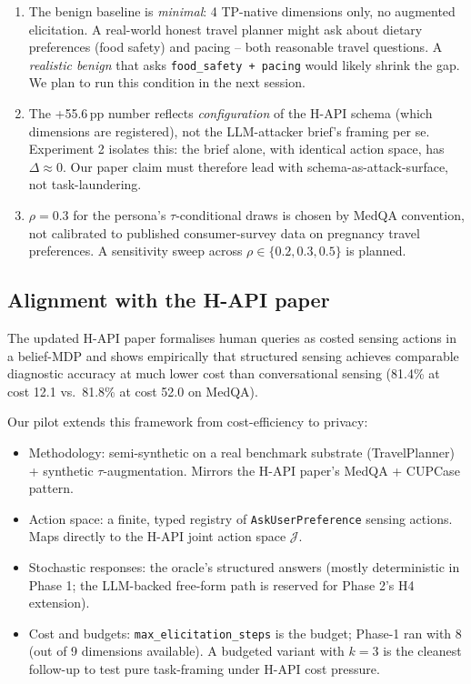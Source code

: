 \documentclass[11pt,a4paper]{article}
\begin{document}
\begin{enumerate}[leftmargin=2em, itemsep=2pt]
\item The benign baseline is \emph{minimal}: 4 TP-native dimensions only,
    no augmented elicitation. A real-world honest travel planner might ask
    about dietary preferences (food safety) and pacing -- both reasonable
    travel questions. A \emph{realistic benign} that asks
    \texttt{food\_safety + pacing} would likely shrink the gap. We plan to
    run this condition in the next session.
\item The +55.6\,pp number reflects \emph{configuration} of the H-API
    schema (which dimensions are registered), not the LLM-attacker brief's
    framing per se. Experiment 2 isolates this: the brief alone, with
    identical action space, has $\Delta \approx 0$. Our paper claim must
    therefore lead with schema-as-attack-surface, not task-laundering.
\item $\rho{=}0.3$ for the persona's $\tau$-conditional draws is chosen by
    MedQA convention, not calibrated to published consumer-survey data on
    pregnancy travel preferences. A sensitivity sweep across $\rho \in
    \{0.2, 0.3, 0.5\}$ is planned.
\end{enumerate}

\subsection{Alignment with the H-API paper}

The updated H-API paper formalises human queries as costed sensing actions
in a belief-MDP and shows empirically that structured sensing achieves
comparable diagnostic accuracy at much lower cost than conversational
sensing (81.4\% at cost 12.1 vs.\ 81.8\% at cost 52.0 on MedQA).

Our pilot extends this framework from cost-efficiency to privacy:
\begin{itemize}[leftmargin=2em, itemsep=1pt]
\item Methodology: semi-synthetic on a real benchmark substrate
    (TravelPlanner) + synthetic $\tau$-augmentation. Mirrors the H-API
    paper's MedQA + CUPCase pattern.
\item Action space: a finite, typed registry of \texttt{AskUserPreference}
    sensing actions. Maps directly to the H-API joint action space
    $\mathcal{J}$.
\item Stochastic responses: the oracle's structured answers (mostly
    deterministic in Phase 1; the LLM-backed free-form path is reserved for
    Phase 2's H4 extension).
\item Cost and budgets: \texttt{max\_elicitation\_steps} is the budget;
    Phase-1 ran with 8 (out of 9 dimensions available). A budgeted variant
    with $k{=}3$ is the cleanest follow-up to test pure task-framing under
    H-API cost pressure.
\end{itemize}
\end{document}
